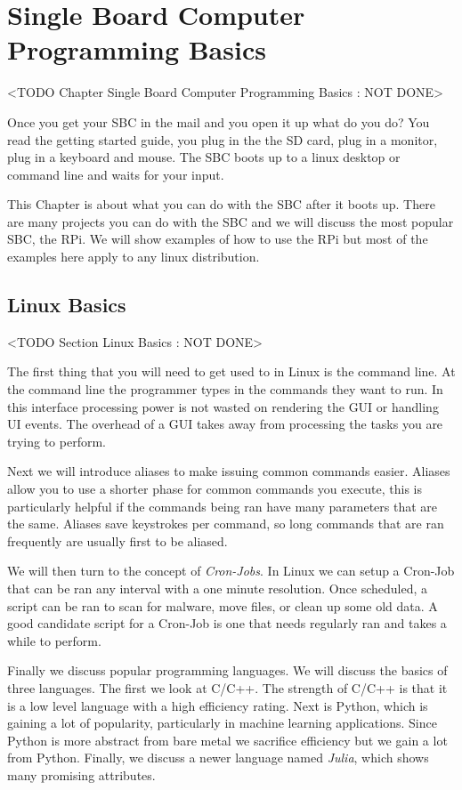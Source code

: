 \chapter{Single Board Computer Programming Basics}
	<TODO Chapter Single Board Computer Programming Basics : NOT DONE>

Once you get your \ac{SBC} in the mail and you open it up what do you do? You read the getting started guide, you plug in the the \ac{SD} card, plug in a monitor, plug in a keyboard and mouse. The \ac{SBC} boots up to a linux desktop or command line and waits for your input. 

This Chapter is about what you can do with the \ac{SBC} after it boots up. There are many projects you can do with the \ac{SBC} and we will discuss the most popular \ac{SBC}, the \ac{RPi}. We will show examples of how to use the \ac{RPi} but most of the examples here apply to any linux distribution. 

\section{Linux Basics}
	<TODO Section Linux Basics : NOT DONE>

The first thing that you will need to get used to in Linux is the command line. At the command line the programmer types in the commands they want to run. In this interface processing power is not wasted on rendering the \ac{GUI} or handling \ac{UI} events. The overhead of a \ac{GUI} takes away from processing the tasks you are trying to perform. 

Next we will introduce aliases to make issuing common commands easier. Aliases allow you to use a shorter phase for common commands you execute, this is particularly helpful if the commands being ran have many parameters that are the same. Aliases save keystrokes per command, so long commands that are ran frequently are usually first to be aliased. 

We will then turn to the concept of \emph{Cron-Jobs}. In Linux we can setup a Cron-Job that can be ran any interval with a one minute resolution. Once scheduled, a script can be ran to scan for malware, move files, or clean up some old data. A good candidate script for a Cron-Job is one that needs regularly ran and takes a while to perform. 

Finally we discuss popular programming languages. We will discuss the basics of three languages. The first we look at C/C++. The strength of C/C++ is that it is a low level language with a high efficiency rating. Next is Python, which is gaining a lot of popularity, particularly in machine learning applications. Since Python is more abstract from bare metal we sacrifice efficiency but we gain a lot from Python. Finally, we discuss a newer language named \emph{Julia}, which shows many promising attributes.  
	
